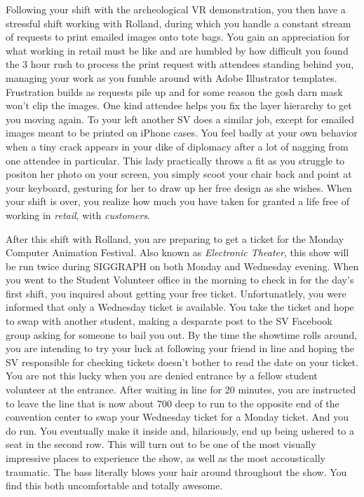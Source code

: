 \documentclass[../main.tex]{subfiles}
\begin{document}
Following your shift with the archeological VR demonstration, you then have a stressful shift working with Rolland, during which you handle a constant stream of requests to print emailed images onto tote bags. You gain an appreciation for what working in retail must be like and are humbled by how difficult you found the 3 hour rush to process the print request with attendees standing behind you, managing your work as you fumble around with Adobe Illustrator templates. Frustration builds as requests pile up and for some reason the gosh darn mask won't clip the images. One kind attendee helps you fix the layer hierarchy to get you moving again. To your left another SV does a similar job, except for emailed images meant to be printed on iPhone cases. You feel badly at your own behavior when a tiny crack appears in your dike of diplomacy after a lot of nagging from one attendee in particular. This lady practically throws a fit as you struggle to positon her photo on your screen, you simply scoot your chair back and point at your keyboard, gesturing for her to draw up her free design as she wishes. When your shift is over, you realize how much you have taken for granted a life free of working in \textit{retail}, with \textit{customers}.

After this shift with Rolland, you are preparing to get a ticket for the Monday Computer Animation Festival. Also known as \textit{Electronic Theater}, this show will be run twice during SIGGRAPH on both Monday and Wednesday evening. When you went to the Student Volunteer office in the morning to check in for the day's first shift, you inquired about getting your free ticket. Unfortunatlely, you were informed that only a Wednesday ticket is available. You take the ticket and hope to swap with another student, making a desparate post to the SV Facebook group asking for someone to bail you out. By the time the showtime rolls around, you are intending to try your luck at following your friend in line and hoping the SV responsible for checking tickets doesn't bother to read the date on your ticket. You are not this lucky when you are denied entrance by a fellow student volunteer at the entrance. After waiting in line for 20 minutes, you are instructed to leave the line that is now about 700 deep to run to the opposite end of the convention center to swap your Wednesday ticket for a Monday ticket. And you do run. You eventually make it inside and, hilariously, end up being ushered to a seat in the second row. This will turn out to be one of the most visually impressive places to experience the show, as well as the most accoustically traumatic. The bass literally blows your hair around throughout the show. You find this both uncomfortable and totally awesome.
\end{document}
